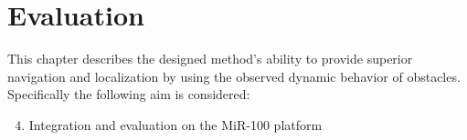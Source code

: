 \chapter{Evaluation}
This chapter describes the designed method's ability to provide superior navigation and localization by using the observed dynamic behavior of obstacles.
Specifically the following aim is considered:

\begin{enumerate}
    \setcounter{enumi}{3}
    \item Integration and evaluation on the MiR-100 platform
\end{enumerate}









